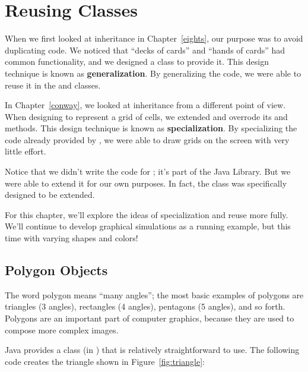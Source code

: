 \chapter{Reusing Classes}


When we first looked at inheritance in Chapter~\ref{eights}, our purpose was to avoid duplicating code.
We noticed that ``decks of cards'' and ``hands of cards'' had common functionality, and we designed a  class to provide it.
This design technique is known as {\bf generalization}.
By generalizing the code, we were able to reuse it in the  and  classes.

In Chapter~\ref{conway}, we looked at inheritance from a different point of view.
When designing  to represent a grid of cells, we extended  and overrode its  and  methods.
This design technique is known as {\bf specialization}.
By specializing the code already provided by , we were able to draw grids on the screen with very little effort.

Notice that we didn't write the code for ; it's part of the Java Library.
But we were able to extend it for our own purposes.
In fact, the  class was specifically designed to be extended.

For this chapter, we'll explore the ideas of specialization and reuse more fully.
We'll continue to develop graphical simulations as a running example, but this time with varying shapes and colors!


\section{Polygon Objects}

The word polygon means ``many angles''; the most basic examples of polygons are triangles (3 angles), rectangles (4 angles), pentagons (5 angles), and so forth.
Polygons are an important part of computer graphics, because they are used to compose more complex images.

Java provides a  class (in ) that is relatively straightforward to use.
The following code creates the triangle shown in Figure~\ref{fig:triangle}:


